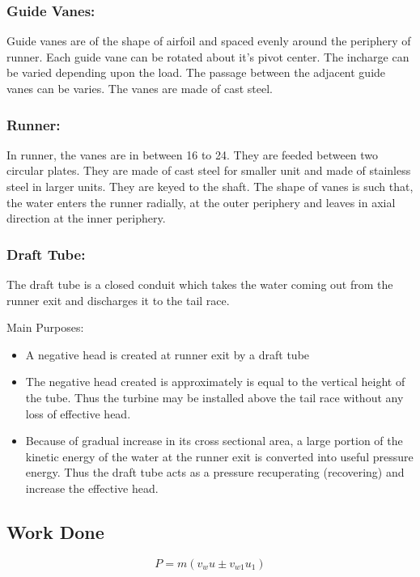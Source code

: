\documentclass{article}
\begin{document}
\begin{multicols*}{2}
\subsubsection*{Guide Vanes:}
Guide vanes are of the shape of airfoil and spaced evenly around the periphery of runner. Each guide vane can be rotated about it's pivot center. The incharge can be varied depending upon the load. The passage between the adjacent guide vanes can be varies. The vanes are made of cast steel.

\subsubsection*{Runner:}
In runner, the vanes are in between 16 to 24. They are feeded between two circular plates. They are made of cast steel for smaller unit and made of stainless steel in larger units. They are keyed to the shaft. The shape of vanes is such that, the water enters the runner radially, at the outer periphery and leaves in axial direction at the inner periphery. 

\subsubsection*{Draft Tube:}
The draft tube is a closed conduit which takes the water coming out from the runner exit and discharges it to the tail race. 

Main Purposes:\\
\begin{itemize}
  \item A negative head is created at runner exit by a draft tube 
  \item The negative head created is approximately is equal to the vertical height of the tube. Thus the turbine may be installed above the tail race without any loss of effective head. 
  \item Because of gradual increase in its cross sectional area, a large portion of the kinetic energy of the water at the runner exit is converted into useful pressure energy. Thus the draft tube acts as a pressure recuperating (recovering) and increase the effective head. 
\end{itemize}

\subsection*{Work Done}
\begin{equation}
  P = m \left(v_w u \pm v_{w1} u_1\right) \label{eq:eq48}
\end{equation}


\end{multicols*}
\end{document}

